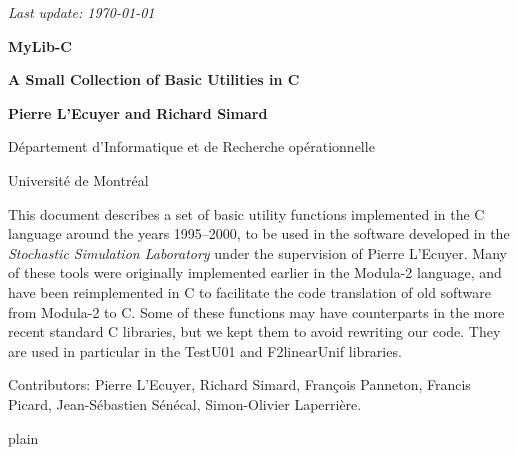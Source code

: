 \documentclass[12pt]{article}
\begin{document}
\begin{titlepage}

\null 
\begin {flushright} \it Last update: \today \end {flushright}

\vfill
{ \centerline {\Large\bf MyLib-C }\bigskip\bigskip
  \centerline {\large\bf A Small Collection of Basic Utilities in C }}
\vfill

\centerline {{\bf Pierre L'Ecuyer and Richard Simard}}
\medskip
\centerline {D\'epartement d'Informatique et de Recherche op\'erationnelle}
\centerline {Universit\'e de Montr\'eal}

\vfill
\medskip

This document describes a set of basic utility functions implemented in the 
C language around the years 1995--2000, to be used in the software developed in the
\emph{Stochastic Simulation Laboratory} under the supervision of Pierre L'Ecuyer.
Many of these tools were originally implemented earlier in the Modula-2 language,
and have been reimplemented in C to facilitate the code translation of old 
software from Modula-2 to C.  Some of these functions may have counterparts in
the more recent standard C libraries, but we kept them to avoid rewriting our code.
They are used in particular in the TestU01 and F2linearUnif libraries.

Contributors:  Pierre L'Ecuyer, Richard Simard, Fran\c cois Panneton,
Francis Picard, Jean-S\'ebastien S\'en\'ecal, Simon-Olivier Laperri\`ere.

\vfill
\end{titlepage}

\tableofcontents
{}














 {plain}

\end{document}
